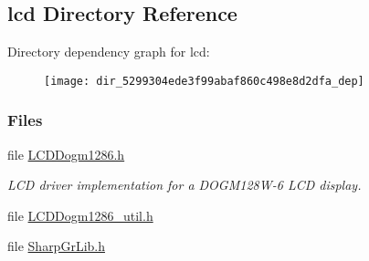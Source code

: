 \subsection{lcd Directory Reference}
\label{dir_5299304ede3f99abaf860c498e8d2dfa}
Directory dependency graph for lcd\+:
\nopagebreak
\begin{figure}[H]
\begin{center}
\leavevmode
\texttt{[image: dir\_5299304ede3f99abaf860c498e8d2dfa\_dep]}
\end{center}
\end{figure}
\subsubsection*{Files}
\begin{DoxyCompactItemize}
\item 
file \hyperlink{_l_c_d_dogm1286_8h}{L\+C\+D\+Dogm1286.\+h}
\begin{DoxyCompactList}\small\item\em L\+C\+D driver implementation for a D\+O\+G\+M128\+W-\/6 L\+C\+D display. \end{DoxyCompactList}\item 
file \hyperlink{_l_c_d_dogm1286__util_8h}{L\+C\+D\+Dogm1286\+\_\+util.\+h}
\item 
file \hyperlink{_sharp_gr_lib_8h}{Sharp\+Gr\+Lib.\+h}
\end{DoxyCompactItemize}
